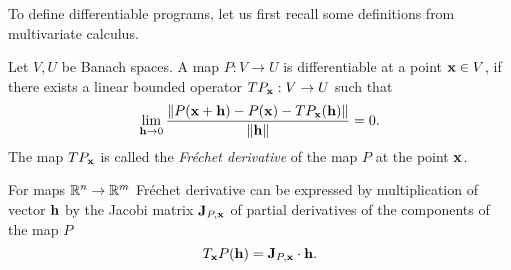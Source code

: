 To define differentiable programs, let us first recall some
definitions from multivariate calculus.
\begin{definition}[Derivative]
  Let $V,U$ be Banach spaces. A map $P:V\to U$ is differentiable at a point
  $\mathbf{x}\in V$, if there exists a linear bounded operator $TP_{\mathbf{x}}:V\to U$ such that
  \begin{equation}
    \label{eq:frechet}
    \lim_{\mathbf{h}\to 0}\frac{\|P(\mathbf{x}+\mathbf{h})-P(\mathbf{x})-TP_{\mathbf{x}}(\mathbf{h})\|}{\|\mathbf{h}\|} = 0.
  \end{equation}
  The map $TP_{\mathbf{x}}$ is called the \emph{Fréchet derivative} of the map $P$ at the
  point $\mathbf{x}$.
\end{definition}
For maps $\mathbb{R}^n\to \mathbb{R}^m$ Fréchet derivative can be expressed by multiplication
of vector $\mathbf{h}$ by the Jacobi matrix $\mathbf{J}_{P,\mathbf{x}}$ of partial
derivatives of the components of the map $P$
\begin{equation*}
  T_{\mathbf{x}} P(\mathbf{h}) = \mathbf{J}_{P,\mathbf{x}}\cdot \mathbf{h}.
\end{equation*}

